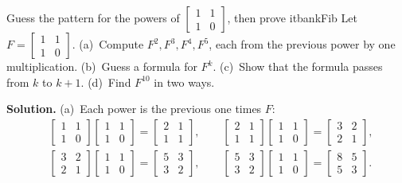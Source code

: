 \documentclass[11pt]{article}
\begin{document}
\begin{exmp}{Guess the pattern for the powers of $\begin{bmatrix}1&1\\1&0\end{bmatrix}$, then prove it}{bankFib}
Let $F=\begin{bmatrix}1&1\\1&0\end{bmatrix}$. (a)~Compute $F^2,F^3,F^4,F^5$, each from the previous power by one multiplication. (b)~Guess a formula for $F^k$. (c)~Show that the formula passes from $k$ to $k+1$. (d)~Find $F^{10}$ in two ways.

\textbf{Solution.} (a)~Each power is the previous one times $F$:
\begin{align*}
&\begin{bmatrix}1&1\\1&0\end{bmatrix}\begin{bmatrix}1&1\\1&0\end{bmatrix}=\begin{bmatrix}2&1\\1&1\end{bmatrix},\qquad
\begin{bmatrix}2&1\\1&1\end{bmatrix}\begin{bmatrix}1&1\\1&0\end{bmatrix}=\begin{bmatrix}3&2\\2&1\end{bmatrix},\\
&\begin{bmatrix}3&2\\2&1\end{bmatrix}\begin{bmatrix}1&1\\1&0\end{bmatrix}=\begin{bmatrix}5&3\\3&2\end{bmatrix},\qquad
\begin{bmatrix}5&3\\3&2\end{bmatrix}\begin{bmatrix}1&1\\1&0\end{bmatrix}=\begin{bmatrix}8&5\\5&3\end{bmatrix}.

\end{align*}
\end{exmp}
\end{document}
